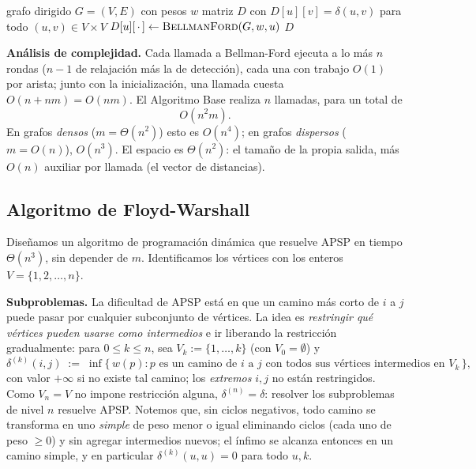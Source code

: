\documentclass[11pt]{article}
\begin{document}
\begin{algorithm}[ht]
\caption{\textsc{AlgoritmoBase}$(G,w)$}\label{alg:base}
\begin{algorithmic}[1]
\Require grafo dirigido $G=(V,E)$ con pesos $w$
\Ensure matriz $D$ con $D[u][v]=\delta(u,v)$ para todo $(u,v)\in V\times V$
  \State $D[u][\,\cdot\,]\gets\textsc{BellmanFord}(G,w,u)$
\EndFor
\State \Return $D$
\end{algorithmic}
\end{algorithm}

\textbf{Análisis de complejidad.} Cada llamada a Bellman-Ford ejecuta a lo
más $n$ rondas ($n-1$ de relajación más la de detección), cada una con
trabajo $O(1)$ por arista; junto con la inicialización, una llamada cuesta
$O(n+nm)=O(nm)$. El Algoritmo Base realiza $n$ llamadas, para un total de
\[
O(n^2 m).
\]
En grafos \emph{densos} ($m=\Theta(n^2)$) esto es $O(n^4)$; en grafos
\emph{dispersos} ($m=O(n)$), $O(n^3)$. El espacio es $\Theta(n^2)$: el
tamaño de la propia salida, más $O(n)$ auxiliar por llamada (el vector de
distancias).

\subsection{Algoritmo de Floyd-Warshall}
\label{sec:fw}

Diseñamos un algoritmo de programación dinámica que resuelve APSP en tiempo
$\Theta(n^3)$, sin depender de $m$. Identificamos los vértices con los
enteros $V=\{1,2,\dots,n\}$.

\textbf{Subproblemas.} La dificultad de APSP está en que un camino más
corto de $i$ a $j$ puede pasar por cualquier subconjunto de vértices. La
idea es \emph{restringir qué vértices pueden usarse como intermedios} e ir
liberando la restricción gradualmente: para $0\le k\le n$, sea
$V_k:=\{1,\dots,k\}$ (con $V_0=\emptyset$) y
\[
\delta^{(k)}(i,j)\;:=\;\inf\{\,w(p) : p\text{ es un camino de } i\text{ a } j
\text{ con todos sus vértices intermedios en } V_k\,\},
\]
con valor $+\infty$ si no existe tal camino; los \emph{extremos} $i,j$ no
están restringidos. Como $V_n=V$ no impone restricción alguna,
$\delta^{(n)}=\delta$: resolver los subproblemas de nivel $n$ resuelve APSP.
Notemos que, sin ciclos negativos, todo camino se transforma en uno
\emph{simple} de peso menor o igual eliminando ciclos (cada uno de peso
$\ge 0$) y sin agregar intermedios nuevos; el ínfimo se alcanza entonces en
un camino simple, y en particular $\delta^{(k)}(u,u)=0$ para todo $u,k$.
\end{document}
